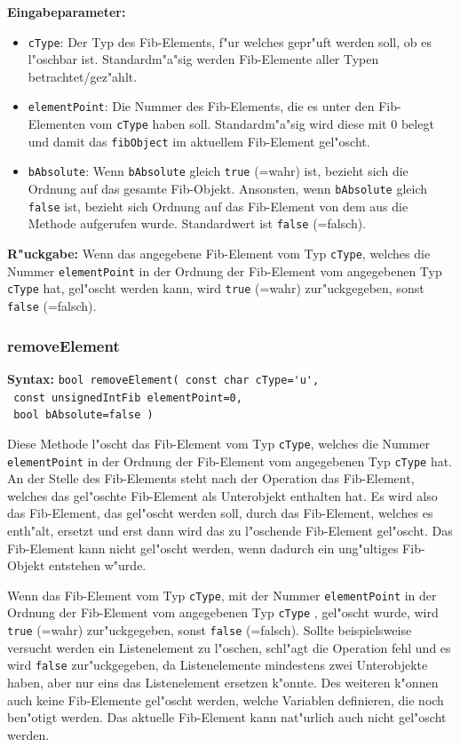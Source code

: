 \bigskip\noindent
\textbf{Eingabeparameter:} 
\begin{itemize}
 \item \verb|cType|: Der Typ des Fib-Elements, f"ur welches gepr"uft werden soll, ob es l"oschbar ist. Standardm"a"sig werden Fib-Elemente aller Typen betrachtet/gez"ahlt.
 \item \verb|elementPoint|: Die Nummer des Fib-Elements, die es unter den Fib-Elementen vom \verb|cType| haben soll. Standardm"a"sig wird diese mit $0$ belegt und damit das \verb|fibObject| im aktuellem Fib-Element gel"oscht.
 \item \verb|bAbsolute|: Wenn \verb|bAbsolute| gleich \verb|true| (=wahr) ist, bezieht sich die Ordnung auf das gesamte Fib-Objekt. Ansonsten, wenn \verb|bAbsolute| gleich \verb|false| ist, bezieht sich Ordnung auf das Fib-Element von dem aus die Methode aufgerufen wurde. Standardwert ist \verb|false| (=falsch).
\end{itemize}

\bigskip\noindent
\textbf{R"uckgabe:} Wenn das angegebene Fib-Element vom Typ \verb|cType|, welches die Nummer \verb|elementPoint| in der Ordnung der Fib-Element vom angegebenen Typ \verb|cType| hat, gel"oscht werden kann, wird \verb|true| (=wahr) zur"uckgegeben, sonst \verb|false| (=falsch).


\subsubsection{removeElement}

\textbf{Syntax:} \verb|bool removeElement( const char cType='u', | \\\verb| const unsignedIntFib elementPoint=0,| \\\verb| bool bAbsolute=false )|

\bigskip\noindent
Diese Methode l"oscht das Fib-Element vom Typ \verb|cType|, welches die Nummer \verb|elementPoint| in der Ordnung der Fib-Element vom angegebenen Typ \verb|cType| hat. An der Stelle des Fib-Elements steht nach der Operation das Fib-Element, welches das gel"oschte Fib-Element als Unterobjekt enthalten hat. Es wird also das Fib-Element, das gel"oscht werden soll, durch das Fib-Element, welches es enth"alt, ersetzt und erst dann wird das zu l"oschende Fib-Element gel"oscht. Das Fib-Element kann nicht gel"oscht werden, wenn dadurch ein ung"ultiges Fib-Objekt entstehen w"urde.

Wenn das Fib-Element vom Typ \verb|cType|, mit der Nummer \verb|elementPoint| in der Ordnung der Fib-Element vom angegebenen Typ \verb|cType| , gel"oscht wurde, wird \verb|true| (=wahr) zur"uckgegeben, sonst \verb|false| (=falsch). Sollte beispielsweise versucht werden ein Listenelement zu l"oschen, schl"agt die Operation fehl und es wird \verb|false| zur"uckgegeben, da Listenelemente mindestens zwei Unterobjekte haben, aber nur eins das Listenelement ersetzen k"onnte. Des weiteren k"onnen auch keine Fib-Elemente gel"oscht werden, welche Variablen definieren, die noch ben"otigt werden.
Das aktuelle Fib-Element kann nat"urlich auch nicht gel"oscht werden.

